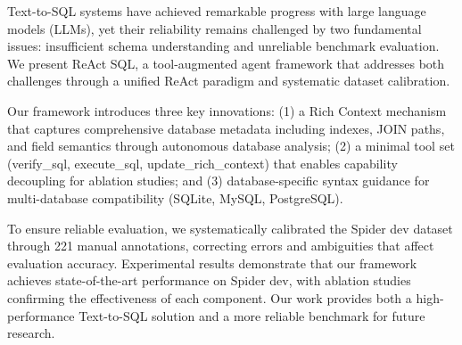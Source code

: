Text-to-SQL systems have achieved remarkable progress with large language models (LLMs), yet their reliability remains challenged by two fundamental issues: insufficient schema understanding and unreliable benchmark evaluation. We present ReAct SQL, a tool-augmented agent framework that addresses both challenges through a unified ReAct paradigm and systematic dataset calibration.

Our framework introduces three key innovations: (1) a Rich Context mechanism that captures comprehensive database metadata including indexes, JOIN paths, and field semantics through autonomous database analysis; (2) a minimal tool set (verify\_sql, execute\_sql, update\_rich\_context) that enables capability decoupling for ablation studies; and (3) database-specific syntax guidance for multi-database compatibility (SQLite, MySQL, PostgreSQL).

To ensure reliable evaluation, we systematically calibrated the Spider dev dataset through 221 manual annotations, correcting errors and ambiguities that affect evaluation accuracy. Experimental results demonstrate that our framework achieves state-of-the-art performance on Spider dev, with ablation studies confirming the effectiveness of each component. Our work provides both a high-performance Text-to-SQL solution and a more reliable benchmark for future research.
